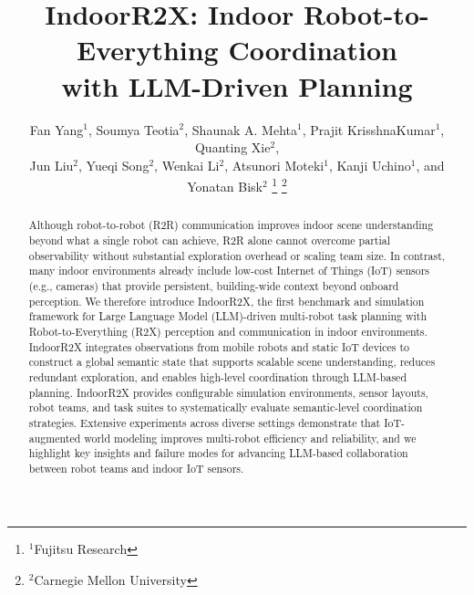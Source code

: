 \title{\LARGE
IndoorR2X: Indoor Robot-to-Everything Coordination\\ with LLM-Driven Planning
\vspace{-0.5em}
}

\author{
    Fan Yang$^{1}$, Soumya Teotia$^{2}$, Shaunak A. Mehta$^{1}$, Prajit KrisshnaKumar$^{1}$, Quanting Xie$^{2}$, \\ 
    Jun Liu$^{2}$, Yueqi Song$^{2}$, Wenkai Li$^{2}$, Atsunori Moteki$^{1}$, Kanji Uchino$^{1}$, and Yonatan Bisk$^{2}$
    \thanks{$^{1}$Fujitsu Research}
    \thanks{$^{2}$Carnegie Mellon University}
}

\maketitle
\thispagestyle{fancy}

\begin{abstract}

Although robot-to-robot (R2R) communication improves indoor scene understanding beyond what a single robot can achieve, R2R alone cannot overcome partial observability without substantial exploration overhead or scaling team size. In contrast, many indoor environments already include low-cost Internet of Things (IoT) sensors (e.g., cameras) that provide persistent, building-wide context beyond onboard perception. We therefore introduce IndoorR2X, the first benchmark and simulation framework for Large Language Model (LLM)-driven multi-robot task planning with Robot-to-Everything (R2X) perception and communication in indoor environments. IndoorR2X integrates observations from mobile robots and static IoT devices to construct a global semantic state that supports scalable scene understanding, reduces redundant exploration, and enables high-level coordination through LLM-based planning. IndoorR2X provides configurable simulation environments, sensor layouts, robot teams, and task suites to systematically evaluate semantic-level coordination strategies. Extensive experiments across diverse settings demonstrate that IoT-augmented world modeling improves multi-robot efficiency and reliability, and we highlight key insights and failure modes for advancing LLM-based collaboration between robot teams and indoor IoT sensors.


\end{abstract}
